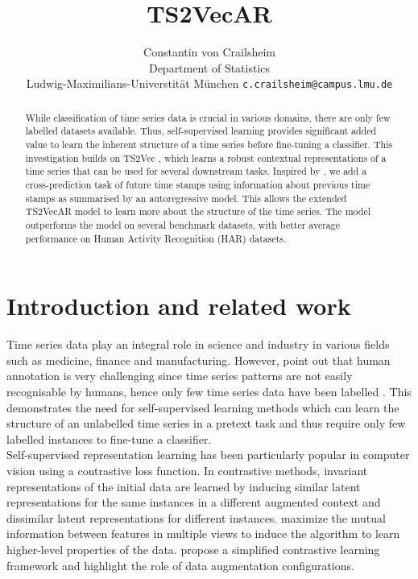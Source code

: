\documentclass{article}
\title{TS2VecAR}
\author{%
  Constantin von Crailsheim \\
Department of Statistics\\
  Ludwig-Maximilians-Universtität München
  \texttt{c.crailsheim@campus.lmu.de} \\
}
\begin{document}
\maketitle


\begin{abstract}
While classification of time series data is crucial in various domains, there are only few labelled datasets available. Thus, self-supervised learning provides significant added value to learn the inherent structure of a time series before fine-tuning a classifier. This investigation builds on TS2Vec \citep{ts2vec}, which learns a robust contextual representations of a time series that can be used for several downstream tasks. Inspired by \citet{tstcc}, we add a cross-prediction task of future time stamps using information about previous time stamps as summarised by an autoregressive model. This allows the extended TS2VecAR model to learn more about the structure of the time series. The model outperforms the model on several benchmark datasets, with better average performance on Human Activity Recognition (HAR) datasets.
\end{abstract}


\section{Introduction and related work}

Time series data play an integral role in science and industry in various fields such as medicine, finance and manufacturing. However, \citet{tstcc} point out that human annotation is very challenging since time series patterns are not easily recognisable by humans, hence only few time series data have been labelled \citep{ching2020}. This demonstrates the need for self-supervised learning methods which can learn the structure of an unlabelled time series in a pretext task and thus require only few labelled instances to fine-tune a classifier. \\

Self-supervised representation learning has been particularly popular in computer vision using a contrastive loss function. In contrastive methods, invariant representations of the initial data are learned by inducing similar latent representations for the same instances in a different augmented context and dissimilar latent representations for different instances. \citet{bachman2019} maximize the mutual information between features in multiple views to induce the algorithm to learn higher-level properties of the data. \citet{simclr} propose a simplified contrastive learning framework and highlight the role of data augmentation configurations. \\
\end{document}
